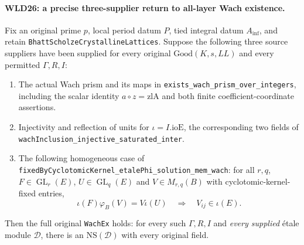 \documentclass[11pt,a4paper]{article}
\numberwithin{equation}{section}
\theoremstyle{remark}\newtheorem{remark}[theorem]{Remark}
\begin{document}
\paragraph{WLD26: a precise three-supplier return to all-layer Wach existence.}
\label{claim:WLD26}
Fix an original prime $p$, local period datum $P$, tied integral
datum $A_{\inf}$, and retain
\texttt{Bhatt\allowbreak Scholze\allowbreak Crystalline\allowbreak Lattices}. Suppose the following
three source suppliers have been supplied for every original
$\mathrm{Good}(K,s,LL)$ and every permitted $\Gamma,R,I$:
\begin{enumerate}
 \item The actual Wach prism and its maps in
 \texttt{exists\_\allowbreak wach\_\allowbreak prism\_\allowbreak over\_\allowbreak integers}, including the
 scalar identity $a\circ z=\mathrm{zlA}$ and both finite
 coefficient-coordinate assertions.
 \item Injectivity and reflection of units for
 $\iota=I.\mathrm{ioE}$, the corresponding two fields of
 \texttt{wach\allowbreak Inclusion\_\allowbreak injective\_\allowbreak saturated\_\allowbreak inter}.
 \item The following homogeneous case of
 \texttt{fixed\allowbreak By\allowbreak Cyclotomic\allowbreak Kernel\_\allowbreak etale\allowbreak Phi\_\allowbreak solution\_\allowbreak mem\_\allowbreak wach}:
 for all $r,q$, $F\in\operatorname{GL}_r(E)$,
 $U\in\operatorname{GL}_q(E)$ and $V\in M_{r,q}(B)$ with
 cyclotomic-kernel-fixed entries,
 \[
                 \iota(F)\varphi_B(V)=V\iota(U)
                     \quad\Longrightarrow\quad V_{ij}\in\iota(E).
 \]
\end{enumerate}
Then the full original \texttt{Wach\allowbreak Ex} holds: for every such
$\Gamma,R,I$ and \emph{every supplied} \'etale module $\mathcal D$,
there is an $\mathrm{NS}(\mathcal D)$ with every original field.
\end{document}
